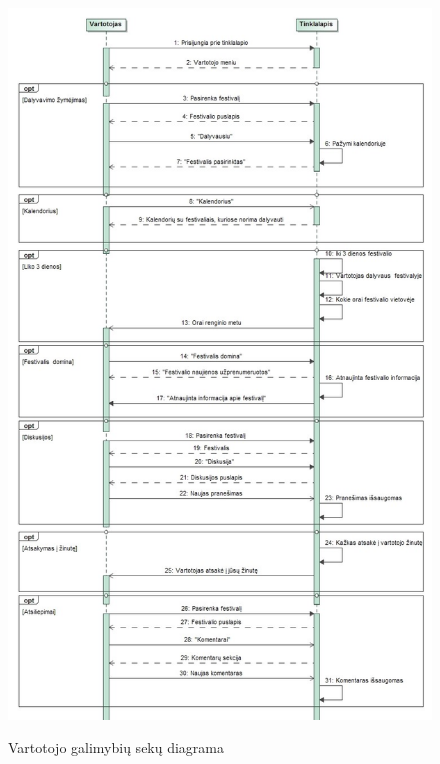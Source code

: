 \documentclass{VUMIFPSkursinis}
\begin{document}
\begin{figure}[H]
    \centering
    \includegraphics[scale=0.5]{img/geri/KlientFun}
    \label{img:uml25}
	\caption{Vartotojo galimybių sekų diagrama}
\end{figure}
\end{document}

